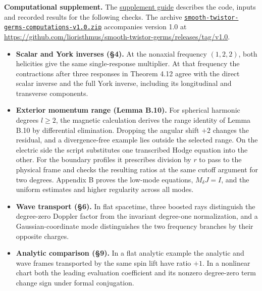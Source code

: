 \documentclass[
  english,
  11pt,
  reqno]{amsart}
\makeatletter
\providecommand{\tightlist}{%
  \setlength{\itemsep}{0pt}\setlength{\parskip}{0pt}}
\newcommand{\paperleadspace}{%
  \par\if@nobreak\else
    \addpenalty{\@secpenalty}\addvspace{.5\baselineskip}%
  \fi}
\newcommand{\paperleadin}[1]{%
  \ifvmode\paperleadspace\fi
  \textbf{#1}}
\makeatother
\begin{document}
\paperleadin{Computational supplement.} The \href{../computations/README.md}{supplement guide} describes the code, inputs and recorded results for the following checks. The archive \href{https://github.com/lioristhmus/smooth-twistor-germs/releases/download/v1.0/smooth-twistor-germs-computations-v1.0.zip}{\nolinkurl{smooth-twistor-germs-computations-v1.0.zip}} accompanies version 1.0 at \url{https://github.com/lioristhmus/smooth-twistor-germs/releases/tag/v1.0}.

\begin{itemize}
\tightlist
\item
  \textbf{Scalar and York inverses (§4).} At the nonaxial frequency
  \((1,2,2)\), both helicities give the same single-response multiplier.
  At that frequency the contractions after three responses in Theorem
  4.12 agree with the direct scalar inverse and the full York inverse,
  including its longitudinal and transverse components.
\item
  \textbf{Exterior momentum range (Lemma B.10).} For spherical harmonic
  degrees \(l\ge2\), the magnetic calculation derives the range identity
  of Lemma B.10 by differential elimination. Dropping the angular shift
  \(+2\) changes the residual, and a divergence-free example lies
  outside the selected range. On the electric side the script
  substitutes one transcribed Hodge equation into the other. For the
  boundary profiles it prescribes division by \(r\) to pass to the
  physical frame and checks the resulting ratios at the same cutoff
  argument for two degrees. Appendix B proves the low-mode equations,
  \(M_\delta J=I\), and the uniform estimates and higher regularity
  across all modes.
\item
  \textbf{Wave transport (§6).} In flat spacetime, three boosted rays
  distinguish the degree-zero Doppler factor from the invariant
  degree-one normalization, and a Gaussian-coordinate mode distinguishes
  the two frequency branches by their opposite charges.
\item
  \textbf{Analytic comparison (§9).} In a flat analytic example the
  analytic and wave frames transported by the same spin lift have ratio
  \(+1\). In a nonlinear chart both the leading evaluation coefficient
  and its nonzero degree-zero term change sign under formal conjugation.
\end{itemize}
\end{document}
